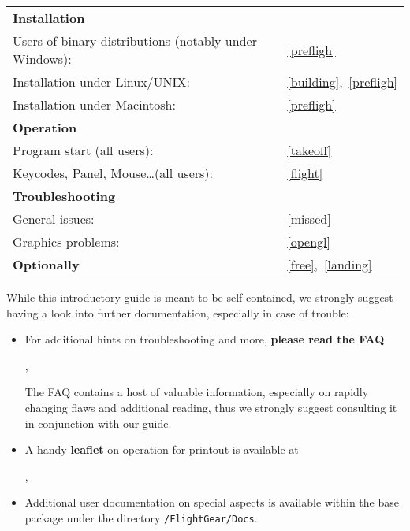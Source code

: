 \noindent
\begin{tabular}{ll}
 \textbf{Installation}                                  	&\\
 Users of binary distributions (notably under Windows):	 	&~\ref{prefligh}\\
 Installation under Linux/UNIX:               			&~\ref{building},~\ref{prefligh}\\
 Installation under Macintosh:               			&~\ref{prefligh}\\
  \textbf{Operation}                           			& \\
 Program start (all users):                      		&~\ref{takeoff}\\
 Keycodes, Panel, Mouse\ldots (all users):       		&~\ref{flight}\\
 \textbf{Troubleshooting}                      				& \\
 General issues:																						&~\ref{missed}\\
 Graphics problems: 									            				&~\ref{opengl}\\
 \textbf{Optionally}                           						&~\ref{free},~\ref{landing} 
\end{tabular}
\bigskip

\noindent
 While this introductory guide is meant to be self contained, we strongly suggest having a look into further documentation, especially in case of trouble:

\begin{itemize}
 \item For additional hints on troubleshooting and more, \textbf{please read the FAQ} 
 \medskip

 \noindent
 ,
 
 The FAQ contains a host of valuable information, especially on rapidly changing flaws and additional reading, thus we strongly suggest consulting it in conjunction with our guide.
 
 
 \item A handy \textbf{leaflet} on operation for printout is available at
 \medskip

 \noindent
 ,
 \item Additional user documentation on special aspects is available within the base package under the directory \texttt{/FlightGear/Docs}.
 \end{itemize}

